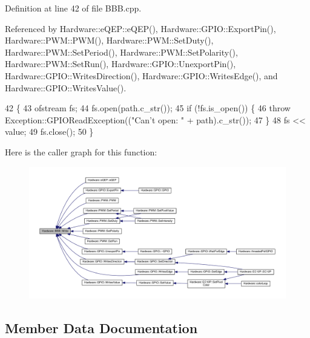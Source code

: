 Definition at line 42 of file B\+B\+B.\+cpp.



Referenced by Hardware\+::e\+Q\+E\+P\+::e\+Q\+E\+P(), Hardware\+::\+G\+P\+I\+O\+::\+Export\+Pin(), Hardware\+::\+P\+W\+M\+::\+P\+W\+M(), Hardware\+::\+P\+W\+M\+::\+Set\+Duty(), Hardware\+::\+P\+W\+M\+::\+Set\+Period(), Hardware\+::\+P\+W\+M\+::\+Set\+Polarity(), Hardware\+::\+P\+W\+M\+::\+Set\+Run(), Hardware\+::\+G\+P\+I\+O\+::\+Unexport\+Pin(), Hardware\+::\+G\+P\+I\+O\+::\+Writes\+Direction(), Hardware\+::\+G\+P\+I\+O\+::\+Writes\+Edge(), and Hardware\+::\+G\+P\+I\+O\+::\+Writes\+Value().


\begin{DoxyCode}
42                                                        \{
43   ofstream fs;
44   fs.open(path.c\_str());
45   \textcolor{keywordflow}{if} (!fs.is\_open()) \{
46     \textcolor{keywordflow}{throw} Exception::GPIOReadException((\textcolor{stringliteral}{"Can't open: "} + path).c\_str());
47   \}
48   fs << value;
49   fs.close();
50 \}
\end{DoxyCode}


Here is the caller graph for this function\+:\nopagebreak
\begin{figure}[H]
\begin{center}
\leavevmode
\includegraphics[width=350pt]{class_hardware_1_1_b_b_b_a155cc06f76d82a6b690ce5ea08e7c68e_icgraph}
\end{center}
\end{figure}




\subsection{Member Data Documentation}
\hypertarget{class_hardware_1_1_b_b_b_a66d583952f3949a732ee15eea81e80e5}{}
